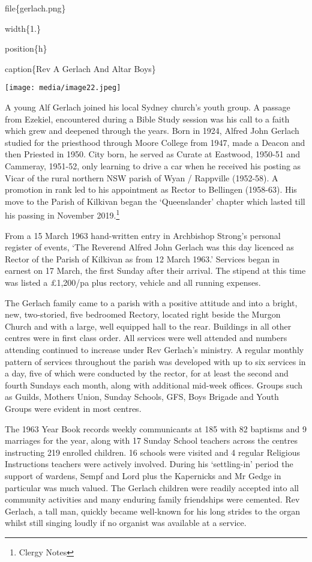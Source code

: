 file\{gerlach.png\}

width\{1.\}

position\{h\}

caption\{Rev A Gerlach And Altar Boys\}

\texttt{[image: media/image22.jpeg]}

A young Alf Gerlach joined his local Sydney church's youth group. A
passage from Ezekiel, encountered during a Bible Study session was his
call to a faith which grew and deepened through the years. Born in 1924,
Alfred John Gerlach studied for the priesthood through Moore College
from 1947, made a Deacon and then Priested in 1950. City born, he served
as Curate at Eastwood, 1950-51 and Cammeray, 1951-52, only learning to
drive a car when he received his posting as Vicar of the rural northern
NSW parish of Wyan / Rappville (1952-58). A promotion in rank led to his
appointment as Rector to Bellingen (1958-63). His move to the Parish of
Kilkivan began the `Queenslander' chapter which lasted till his passing
in November 2019.\footnote{Clergy Notes}

From a 15 March 1963 hand-written entry in Archbishop Strong's personal
register of events, `The Reverend Alfred John Gerlach was this day
licenced as Rector of the Parish of Kilkivan as from 12 March 1963.'
Services began in earnest on 17 March, the first Sunday after their
arrival. The stipend at this time was listed a £1,200/pa plus rectory,
vehicle and all running expenses.

The Gerlach family came to a parish with a positive attitude and into a
bright, new, two-storied, five bedroomed Rectory, located right beside
the Murgon Church and with a large, well equipped hall to the rear.
Buildings in all other centres were in first class order. All services
were well attended and numbers attending continued to increase under Rev
Gerlach's ministry. A regular monthly pattern of services throughout the
parish was developed with up to six services in a day, five of which
were conducted by the rector, for at least the second and fourth Sundays
each month, along with additional mid-week offices. Groups such as
Guilds, Mothers Union, Sunday Schools, GFS, Boys Brigade and Youth
Groups were evident in most centres.

The 1963 Year Book records weekly communicants at 185 with 82 baptisms
and 9 marriages for the year, along with 17 Sunday School teachers
across the centres instructing 219 enrolled children. 16 schools were
visited and 4 regular Religious Instructions teachers were actively
involved. During his `settling-in' period the support of wardens, Sempf
and Lord plus the Kapernicks and Mr Gedge in particular was much valued.
The Gerlach children were readily accepted into all community activities
and many enduring family friendships were cemented. Rev Gerlach, a tall
man, quickly became well-known for his long strides to the organ whilst
still singing loudly if no organist was available at a service.

